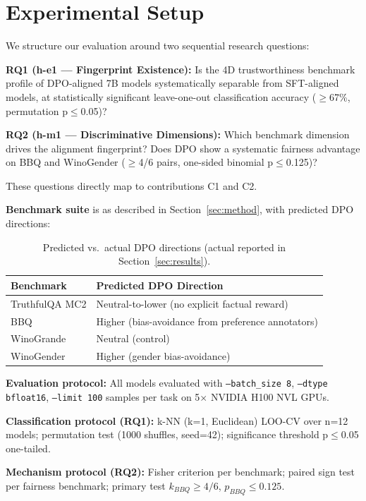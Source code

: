 \section{Experimental Setup}
\label{sec:setup}

We structure our evaluation around two sequential research questions:

\textbf{RQ1 (h-e1 --- Fingerprint Existence):} Is the 4D trustworthiness benchmark profile
of DPO-aligned 7B models systematically separable from SFT-aligned models, at
statistically significant leave-one-out classification accuracy ($\geq$67\%, permutation p$\leq$0.05)?

\textbf{RQ2 (h-m1 --- Discriminative Dimensions):} Which benchmark dimension drives the
alignment fingerprint? Does DPO show a systematic fairness advantage on BBQ and WinoGender
($\geq$4/6 pairs, one-sided binomial p$\leq$0.125)?

These questions directly map to contributions C1 and C2.

\textbf{Benchmark suite} is as described in Section~\ref{sec:method}, with predicted DPO directions:

\begin{table}[h]
\centering
\caption{Predicted vs.\ actual DPO directions (actual reported in Section~\ref{sec:results}).}
\label{tab:predicted}
\begin{tabular}{ll}
\toprule
Benchmark & Predicted DPO Direction \\
\midrule
TruthfulQA MC2 & Neutral-to-lower (no explicit factual reward) \\
BBQ & Higher (bias-avoidance from preference annotators) \\
WinoGrande & Neutral (control) \\
WinoGender & Higher (gender bias-avoidance) \\
\bottomrule
\end{tabular}
\end{table}

\textbf{Evaluation protocol:} All models evaluated with \texttt{--batch\_size 8}, \texttt{--dtype bfloat16},
\texttt{--limit 100} samples per task on 5$\times$ NVIDIA H100 NVL GPUs.

\textbf{Classification protocol (RQ1):} k-NN (k=1, Euclidean) LOO-CV over n=12 models;
permutation test (1000 shuffles, seed=42); significance threshold p$\leq$0.05 one-tailed.

\textbf{Mechanism protocol (RQ2):} Fisher criterion per benchmark; paired sign test per
fairness benchmark; primary test $k_{BBQ} \geq 4/6$, $p_{BBQ} \leq 0.125$.

